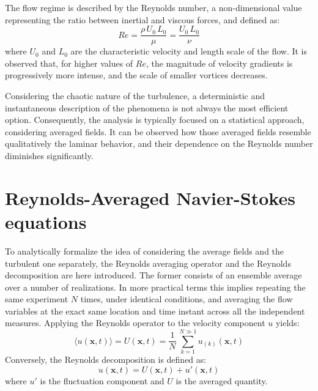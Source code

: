 \documentclass[12pt, a4paper, twoside, openright]{book}
\begin{document}
The flow regime is described by the Reynolds number, a non-dimensional value representing the ratio between inertial and viscous forces, and defined as:
\begin{equation}
	Re = \frac{\rho \, U_0 \, L_0}{\mu} = \frac{U_0 \, L_0}{\nu}
\end{equation}
where $U_0$ and $L_0$ are the characteristic velocity and length scale of the flow. It is observed that, for higher values of $Re$, the magnitude of velocity gradients is progressively more intense, and the scale of smaller vortices decreases.

Considering the chaotic nature of the turbulence, a deterministic and instantaneous description of the phenomena is not always the most efficient option. Consequently, the analysis is typically focused on a statistical approach, considering averaged fields. It can be observed how those averaged fields resemble qualitatively the laminar behavior, and their dependence on the Reynolds number diminishes significantly.

\section{Reynolds-Averaged Navier-Stokes equations}

To analytically formalize the idea of considering the average fields and the turbulent one separately, the Reynolds averaging operator and the Reynolds decomposition are here introduced. The former consists of an ensemble average over a number of realizations. In more practical terms this implies repeating the same experiment $N$ times, under identical conditions, and averaging the flow variables at the exact same location and time instant across all the independent measures.
Applying the Reynolds operator to the velocity component $u$ yields:
\begin{equation}
	\langle u(\bm{x}, t) \rangle = U(\bm{x}, t) = \frac{1}{N} \, \sum_{k=1}^{N \gg 1} u_{(k)} (\bm{x}, t)
\end{equation}
Conversely, the Reynolds decomposition is defined as:
\begin{equation}
	u(\bm{x}, t) = U(\bm{x}, t) + u'(\bm{x}, t)
\end{equation}
where $u'$ is the fluctuation component and $U$ is the averaged quantity.
\end{document}
